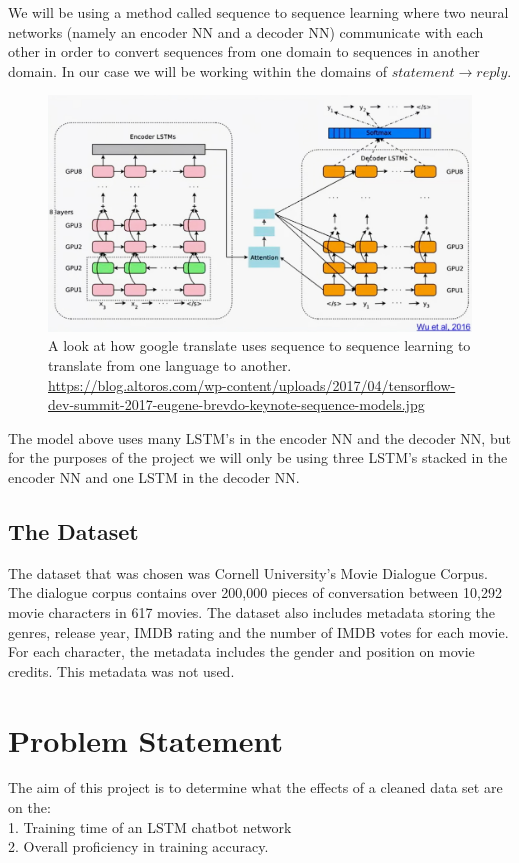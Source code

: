 \documentclass[titlepage]{article}
\newcommand\tab[1][1cm]{\hspace*{#1}}
\begin{document}
\tab We will be using a method called sequence to sequence learning where two neural networks (namely an encoder NN and a decoder NN) communicate with each other in order to convert sequences from one domain to sequences in another domain. In our case we will be working within the domains of $statement\rightarrow reply$.
\begin{figure}[H]
	\centering
	\captionsetup{justification=centering}
	\includegraphics[width=120mm]{images/Seq2seq.jpg}
	\caption{A look at how google translate uses sequence to sequence learning to translate from one language to another. \\{\tiny \url{https://blog.altoros.com/wp-content/uploads/2017/04/tensorflow-dev-summit-2017-eugene-brevdo-keynote-sequence-models.jpg}}}
	\label{fig:seq2seqgoogletranslate}
\end{figure}
The model above uses many LSTM's in the encoder NN and the decoder NN, but for the purposes of the project we will only be using three LSTM's stacked in the encoder NN and one LSTM in the decoder NN.\\

\subsection*{The Dataset}
The dataset that was chosen was Cornell University's Movie Dialogue Corpus.\cite{chameleons, cornell} The dialogue corpus contains over 200,000 pieces of conversation between 10,292 movie characters in 617 movies. The dataset also includes metadata storing the genres, release year, IMDB rating and the number of IMDB votes for each movie. For each character, the metadata includes the gender and position on movie credits. This metadata was not used.

\section{Problem Statement}
The aim of this project is to determine what the effects of a cleaned data set are on the:\\
\tab 1. Training time of an LSTM chatbot network\\
\tab 2. Overall proficiency in training accuracy.
\newpage
\end{document}
